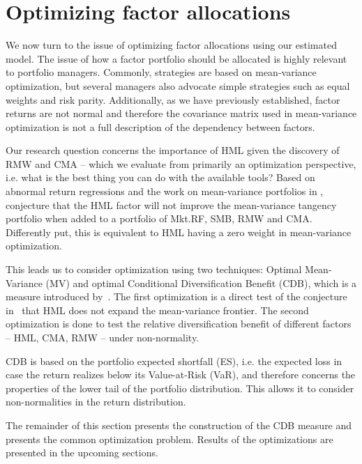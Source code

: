 
\section{Optimizing factor allocations} %
\label{sec:optimizing_factor_allocations}

We now turn to the issue of optimizing factor allocations using our estimated model. The issue of how a factor portfolio should be allocated is highly relevant to portfolio managers. Commonly, strategies are based on mean-variance optimization, but several managers also advocate simple strategies such as equal weights and risk parity. Additionally, as we have previously established, factor returns are not normal and therefore the covariance matrix used in mean-variance optimization is not a full description of the dependency between factors.

Our research question concerns the importance of HML given the discovery of RMW and CMA -- which we evaluate from primarily an optimization perspective, i.e. what is the best thing you can do with the available tools? Based on abnormal return regressions and the work on mean-variance portfolios in \textcite{HubermanKandel1987}, \textcite{FF2015} conjecture that the HML factor will not improve the mean-variance tangency portfolio when added to a portfolio of Mkt.RF, SMB, RMW and CMA. Differently put, this is equivalent to HML having a zero weight in mean-variance optimization.

This leads us to consider optimization using two techniques: Optimal Mean-Variance (MV) and optimal Conditional Diversification Benefit (CDB), which is a measure introduced by~\textcite{ChristoffersenErrunzaJacobLanglois2012}. The first optimization is a direct test of the conjecture in~\textcite{FF2015} that HML does not expand the mean-variance frontier. The second optimization is done to test the relative diversification benefit of different factors -- HML, CMA, RMW -- under non-normality.

CDB is based on the portfolio expected shortfall (ES), i.e. the expected loss in case the return realizes below its Value-at-Risk (VaR), and therefore concerns the properties of the lower tail of the portfolio distribution. This allows it to consider non-normalities in the return distribution.

The remainder of this section presents the construction of the CDB measure and presents the common optimization problem. Results of the optimizations are presented in the upcoming sections.

